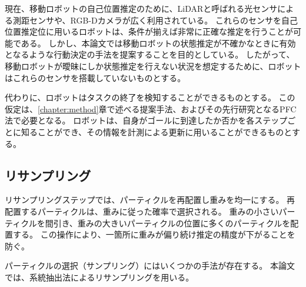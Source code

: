 現在、移動ロボットの自己位置推定のために、LiDARと呼ばれる光センサによる測距センサや、RGB-Dカメラが広く利用されている。
これらのセンサを自己位置推定位に用いるロボットは、条件が揃えば非常に正確な推定を行うことが可能である。
しかし、本論文では移動ロボットの状態推定が不確かなときに有効となるような行動決定の手法を提案することを目的としている。
したがって、移動ロボットが曖昧にしか状態推定を行えない状況を想定するために、ロボットはこれらのセンサを搭載していないものとする。

代わりに、ロボットはタスクの終了を検知することができるものとする。
この仮定は、\ref{chapter:method}章で述べる提案手法、およびその先行研究となるPFC法で必要となる。
ロボットは、自身がゴールに到達したか否かを各ステップごとに知ることができ、その情報を計測による更新に用いることができるものとする。

\subsection{リサンプリング}
リサンプリングステップでは、パーティクルを再配置し重みを均一にする。
再配置するパーティクルは、重みに従った確率で選択される。
重みの小さいパーティクルを間引き、重みの大きいパーティクルの位置に多くのパーティクルを配置する。
この操作により、一箇所に重みが偏り続け推定の精度が下がることを防ぐ。

パーティクルの選択（サンプリング）にはいくつかの手法が存在する。
本論文では、系統抽出法によるリサンプリングを用いる。
